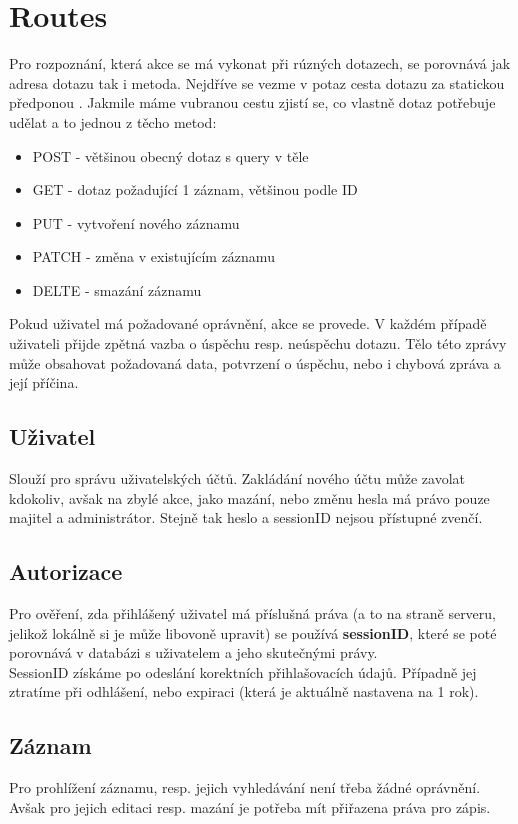 \section{Routes}
Pro rozpoznání, která akce se má vykonat při rúzných dotazech, se porovnává
jak adresa dotazu tak i metoda. Nejdříve se vezme v potaz cesta dotazu za
statickou předponou .
Jakmile máme vubranou cestu zjistí se, co vlastně dotaz potřebuje udělat a to jednou z těcho metod:
\begin{itemize}
     \item POST - většinou obecný dotaz s query v těle
     \item GET - dotaz požadující 1 záznam, většinou podle ID
     \item PUT - vytvoření nového záznamu
     \item PATCH - změna v existujícím záznamu
     \item DELTE - smazání záznamu
\end{itemize}
Pokud uživatel má požadované oprávnění, akce se provede. V každém případě
uživateli přijde zpětná vazba o úspěchu resp. neúspěchu dotazu. Tělo
této zprávy může obsahovat požadovaná data, potvrzení o úspěchu, nebo i
chybová zpráva a její příčina.

\subsection{Uživatel}
Slouží pro správu uživatelských účtů.
Zakládání nového účtu může zavolat kdokoliv, avšak na zbylé akce, jako
mazání, nebo změnu hesla má právo pouze majitel a administrátor.
Stejně tak heslo a sessionID nejsou přístupné zvenčí.
\subsection{Autorizace}
Pro ověření, zda přihlášený uživatel má příslušná práva
(a to na straně serveru, jelikož lokálně si je může libovoně upravit) se používá
\textbf{sessionID}, které se poté porovnává v databázi s uživatelem a jeho skutečnými právy.\\
SessionID získáme po odeslání korektních přihlašovacích údajů. Případně jej ztratíme při odhlášení, nebo
expiraci (která je aktuálně nastavena na 1 rok).
\subsection{Záznam}
Pro prohlížení záznamu, resp. jejich vyhledávání není třeba žádné oprávnění. Avšak pro jejich editaci resp. mazání
je potřeba mít přiřazena práva pro zápis.
